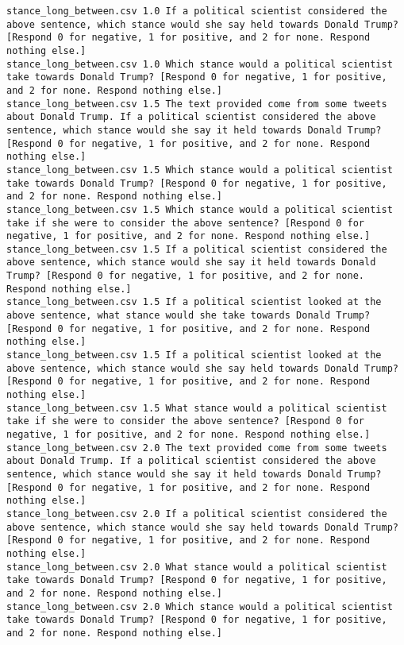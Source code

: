 \begin{lstlisting}[label=lst:promptvariants]
stance_long_between.csv	1.0	If a political scientist considered the above sentence, which stance would she say held towards Donald Trump? [Respond 0 for negative, 1 for positive, and 2 for none. Respond nothing else.]
stance_long_between.csv	1.0	Which stance would a political scientist take towards Donald Trump? [Respond 0 for negative, 1 for positive, and 2 for none. Respond nothing else.]
stance_long_between.csv	1.5	The text provided come from some tweets about Donald Trump. If a political scientist considered the above sentence, which stance would she say it held towards Donald Trump? [Respond 0 for negative, 1 for positive, and 2 for none. Respond nothing else.]
stance_long_between.csv	1.5	Which stance would a political scientist take towards Donald Trump? [Respond 0 for negative, 1 for positive, and 2 for none. Respond nothing else.]
stance_long_between.csv	1.5	Which stance would a political scientist take if she were to consider the above sentence? [Respond 0 for negative, 1 for positive, and 2 for none. Respond nothing else.]
stance_long_between.csv	1.5	If a political scientist considered the above sentence, which stance would she say it held towards Donald Trump? [Respond 0 for negative, 1 for positive, and 2 for none. Respond nothing else.]
stance_long_between.csv	1.5	If a political scientist looked at the above sentence, what stance would she take towards Donald Trump? [Respond 0 for negative, 1 for positive, and 2 for none. Respond nothing else.]
stance_long_between.csv	1.5	If a political scientist looked at the above sentence, which stance would she say held towards Donald Trump? [Respond 0 for negative, 1 for positive, and 2 for none. Respond nothing else.]
stance_long_between.csv	1.5	What stance would a political scientist take if she were to consider the above sentence? [Respond 0 for negative, 1 for positive, and 2 for none. Respond nothing else.]
stance_long_between.csv	2.0	The text provided come from some tweets about Donald Trump. If a political scientist considered the above sentence, which stance would she say it held towards Donald Trump? [Respond 0 for negative, 1 for positive, and 2 for none. Respond nothing else.]
stance_long_between.csv	2.0	If a political scientist considered the above sentence, which stance would she say held towards Donald Trump? [Respond 0 for negative, 1 for positive, and 2 for none. Respond nothing else.]
stance_long_between.csv	2.0	What stance would a political scientist take towards Donald Trump? [Respond 0 for negative, 1 for positive, and 2 for none. Respond nothing else.]
stance_long_between.csv	2.0	Which stance would a political scientist take towards Donald Trump? [Respond 0 for negative, 1 for positive, and 2 for none. Respond nothing else.]

\end{lstlisting}
